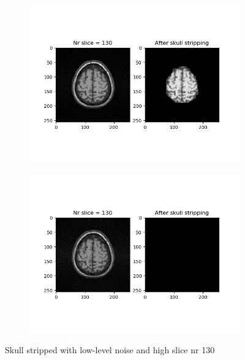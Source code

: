 \begin{figure}[H]
	\centering
	\begin{subfigure}[b]{0.35\linewidth}
		\includegraphics[scale=0.35]{figures/Module_08/M8_14.png}
	\end{subfigure}
		\begin{subfigure}[b]{0.35\linewidth}
		\includegraphics[scale=0.35]{figures/Module_08/M8_n14.png}
	\end{subfigure}
	\caption{Skull stripped with low-level noise and high slice nr 130}
	\label{fig:figures/m08_14}
\end{figure}


